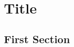 \chapter{Title} 
\label{chap:Chapter 1}



\blindmathpaper %

\section{First Section}

\blindmathpaper %